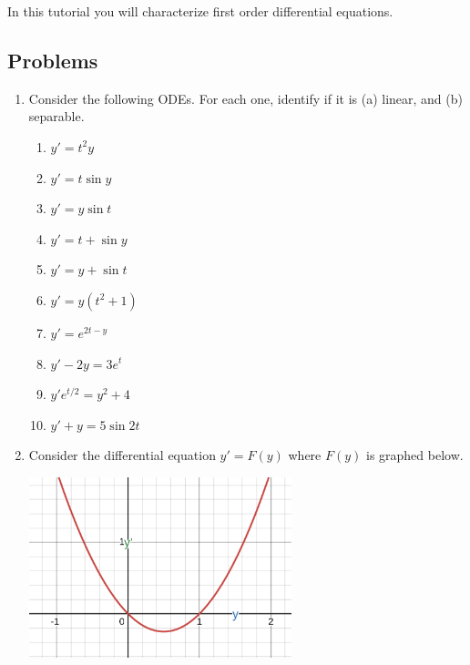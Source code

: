 \begin{objectives}
	In this tutorial you will characterize first order differential equations.
\end{objectives}

\subsection*{Problems}
\begin{enumerate}
    \item Consider the following ODEs. For each one, identify if it is (a) linear, and (b) separable.

    \begin{tcolorbox}[sharp corners=all,colframe=tolGrey,colback=white]
        \begin{multicols}{2}
        \begin{enumerate}[label={(\roman{enumii})},nosep,itemsep=1mm]
            \item $y'=t^2y$
            \item $y'=t\sin y$
            \item $y'=y\sin t$
            \item $y'=t+\sin y$
            \item $y'=y+\sin t$
            \item $y'=y(t^2+1)$
            \item $y'=e^{2t-y}$
            \item $y'-2y=3e^t$
            \item $y'e^{t/2}=y^2+4$
            \item $y'+y=5\sin 2t$
        \end{enumerate}
        \end{multicols}
    \end{tcolorbox}


    \item Consider the differential equation $y'=F(y)$ where $F(y)$ is graphed
    below.

    \begin{center}
    \includegraphics[width=3in]{resources/tutorial-07-phase1.png}
    \end{center}


\end{enumerate}

